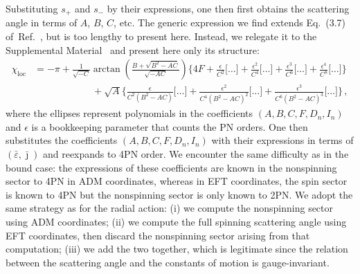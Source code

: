\documentclass[prd,superscriptaddress,preprintnumbers,tightenlines,nofootinbib, eqsecnum]{revtex4-2}
\newcommand{\nn}{\nonumber}
\begin{document}
%
Substituting $s_+$ and $s_-$ by their expressions, one then first obtains the scattering angle in terms of $A$, $B$, $C$, etc. The generic expression we find extends Eq.~(3.7) of~Ref.~\cite{Usseglio:2025iwt}, but is too lengthy to present here. Instead, we relegate it to the Supplemental Material~\cite{Supplemental} and present here only its structure: 
%
\begin{align}
    \chi_\text{loc} &= - \pi + \frac{1}{\sqrt{-C}} \arctan\left(\frac{B+\sqrt{B^2-A C}}{\sqrt{-A C}}\right)\Bigg\{4F + \frac{\epsilon}{C^2}\Bigg[\dots\Bigg] + \frac{\epsilon^2}{C^4}\Bigg[\dots\Bigg]  + \frac{\epsilon^3}{C^6}\Bigg[\dots\Bigg]  + \frac{\epsilon^4}{C^8}\Bigg[\dots\Bigg] \Bigg\}\nn\\
    &\qquad\qquad\qquad + \sqrt{A}\Bigg\{\frac{\epsilon}{C^2(B^2-AC)}\Bigg[\dots\Bigg]+\frac{\epsilon^2}{C^4(B^2-AC)^2}\Bigg[\dots\Bigg]+\frac{\epsilon^3}{C^6(B^2-AC)^3}\Bigg[\dots\Bigg]\Bigg\} \,,
\end{align}
where the ellipses represent polynomials in the coefficients $(A,B,C,F,D_n,I_n)$ and $\epsilon$ is a bookkeeping parameter that counts the PN orders. 
%
One then substitutes the coefficients $(A,B,C,F,D_n,I_n)$ with their expressions in terms of $(\bar{\varepsilon},\bar{\jmath})$ and reexpands to 4PN order. We encounter the same difficulty as in the bound case: the expressions of these coefficients are known in the nonspinning sector to 4PN in ADM coordinates, whereas in EFT coordinates, the spin sector is known to 4PN but the nonspinning sector is only known to 2PN. We adopt the same strategy as for the radial action: (i) we compute the nonspinning sector using ADM coordinates; (ii) we compute the full spinning scattering angle using EFT coordinates, then discard the nonspinning sector arising from that computation; (iii) we add the two together, which is legitimate since the relation between the scattering angle and the constants of motion is gauge-invariant.
\end{document}
